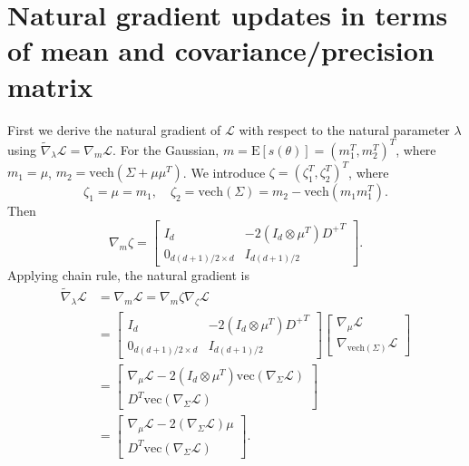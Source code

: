\documentclass{statsoc}
\newcommand\E{{\text{E}}}
\newcommand\mL{{\mathcal{L}}}
\newcommand{\vc}{\text{vec}}
\newcommand{\vech}{\text{vech}}
\begin{document}
\section{Natural gradient updates in terms of mean and covariance/precision matrix} \label{S1}

First we derive the natural gradient of $\mL$ with respect to the natural parameter $\lambda$ using $\widetilde{\nabla}_\lambda \mL = \nabla_m \mL$. For the Gaussian, $m = \E[s(\theta)] = (m_1^T, m_2^T )^T$, where $m_1 = \mu$, $m_2 = \vech(\Sigma + \mu \mu^T) $. We introduce $\zeta = (\zeta_1^T, \zeta_2^T)^T$, where
\[
\zeta_1 = \mu = m_1, \quad \zeta_2 = \vech(\Sigma) = m_2 - \vech(m_1 m_1^T).
\]
Then
\[
\nabla_m \zeta 
= \begin{bmatrix} I_d & -2(I_d \otimes \mu^T){D^+}^T \\ 0_{d(d+1)/2 \times d} & I_{d(d+1)/2}  \end{bmatrix}.
\]
Applying chain rule, the natural gradient is 
\[
\begin{aligned}
\widetilde{\nabla}_\lambda \mL 
&= \nabla_m \mL =\nabla_m \zeta \nabla_\zeta \mL \\
&= \begin{bmatrix} I_d & -2(I_d \otimes \mu^T){D^+}^T \\ 0_{d(d+1)/2 \times d} & I_{d(d+1)/2}  \end{bmatrix} \begin{bmatrix} \nabla_\mu \mL \\ \nabla_{\vech(\Sigma)} \mL  \end{bmatrix} \\
&= \begin{bmatrix} \nabla_\mu \mL -2(I_d \otimes \mu^T) \vc(\nabla_{\Sigma} \mL) \\  D^T \vc(\nabla_{\Sigma} \mL) \end{bmatrix} \\
&= \begin{bmatrix} \nabla_\mu \mL - 2(\nabla_{\Sigma}\mL) \mu \\  D^T \vc(\nabla_{\Sigma} \mL) \end{bmatrix}.
\end{aligned}
\]
\end{document}
